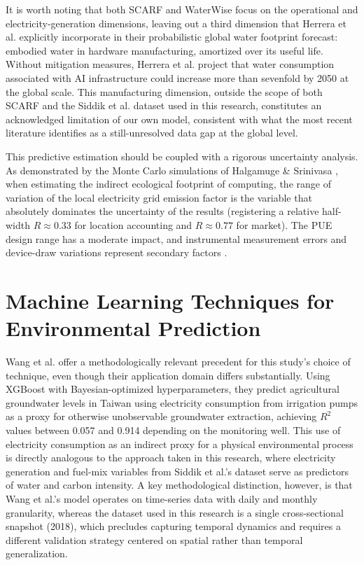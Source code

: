 \documentclass[conference]{IEEEtran}
\begin{document}
It is worth noting that both SCARF and WaterWise focus on the operational and electricity-generation dimensions, leaving out a third dimension that Herrera et al. \cite{Herrera2025} explicitly incorporate in their probabilistic global water footprint forecast: embodied water in hardware manufacturing, amortized over its useful life. Without mitigation measures, Herrera et al. project that water consumption associated with AI infrastructure could increase more than sevenfold by 2050 at the global scale. This manufacturing dimension, outside the scope of both SCARF and the Siddik et al. \cite{Siddik2021} dataset used in this research, constitutes an acknowledged limitation of our own model, consistent with what the most recent literature identifies as a still-unresolved data gap at the global level.

This predictive estimation should be coupled with a rigorous uncertainty analysis. As demonstrated by the Monte Carlo simulations of Halgamuge \& Srinivasa \cite{Halgamuge2026}, when estimating the indirect ecological footprint of computing, the range of variation of the local electricity grid emission factor is the variable that absolutely dominates the uncertainty of the results (registering a relative half-width $R \approx 0.33$ for location accounting and $R \approx 0.77$ for market). The PUE design range has a moderate impact, and instrumental measurement errors and device-draw variations represent secondary factors \cite{Halgamuge2026}.

\section{Machine Learning Techniques for Environmental Prediction}

Wang et al. \cite{Wang2025XGBoost} offer a methodologically relevant precedent for this study's choice of technique, even though their application domain differs substantially. Using XGBoost with Bayesian-optimized hyperparameters, they predict agricultural groundwater levels in Taiwan using electricity consumption from irrigation pumps as a proxy for otherwise unobservable groundwater extraction, achieving $R^2$ values between 0.057 and 0.914 depending on the monitoring well. This use of electricity consumption as an indirect proxy for a physical environmental process is directly analogous to the approach taken in this research, where electricity generation and fuel-mix variables from Siddik et al.'s \cite{Siddik2021} dataset serve as predictors of water and carbon intensity. A key methodological distinction, however, is that Wang et al.'s model operates on time-series data with daily and monthly granularity, whereas the dataset used in this research is a single cross-sectional snapshot (2018), which precludes capturing temporal dynamics and requires a different validation strategy centered on spatial rather than temporal generalization.
\end{document}
